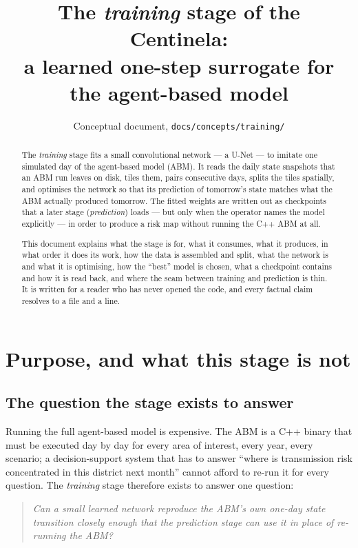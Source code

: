 \documentclass[11pt,a4paper]{article}
\title{The \emph{training} stage of the Centinela:\\
a learned one-step surrogate for the agent-based model}
\author{Conceptual document, \texttt{docs/concepts/training/}}
\date{}
\begin{document}
\maketitle

\begin{abstract}
The \emph{training} stage fits a small convolutional network --- a U-Net --- to
imitate one simulated day of the agent-based model (ABM). It reads the daily
state snapshots that an ABM run leaves on disk, tiles them, pairs consecutive
days, splits the tiles spatially, and optimises the network so that its
prediction of tomorrow's state matches what the ABM actually produced
tomorrow. The fitted weights are written out as checkpoints that a later
stage (\emph{prediction}) loads --- but only when the operator names the
model explicitly --- in order to produce a risk map without running the C++
ABM at all.

This document explains what the stage is for, what it consumes, what it
produces, in what order it does its work, how the data is assembled and split,
what the network is and what it is optimising, how the ``best'' model is
chosen, what a checkpoint contains and how it is read back, and where the
seam between training and prediction is thin. It is written for a reader who
has never opened the code, and every factual claim resolves to a file and a
line.
\end{abstract}

\tableofcontents

\section{Purpose, and what this stage is not}
\label{sec:purpose}

\subsection{The question the stage exists to answer}

Running the full agent-based model is expensive. The ABM is a C++ binary that
must be executed day by day for every area of interest, every year, every
scenario; a decision-support system that has to answer ``where is transmission
risk concentrated in this district next month'' cannot afford to re-run it for
every question. The \emph{training} stage therefore exists to answer one
question:

\begin{quote}
\emph{Can a small learned network reproduce the ABM's own one-day state
transition closely enough that the prediction stage can use it in place of
re-running the ABM?}
\end{quote}
\end{document}
